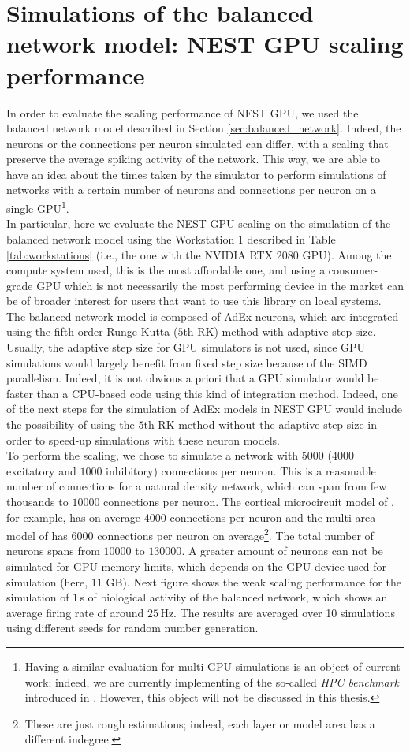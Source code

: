 \documentclass[a4paper, 12pt, twoside, openright]{book}
\begin{document}
\section{Simulations of the balanced network model: NEST GPU scaling performance}
In order to evaluate the scaling performance of NEST GPU, we used the balanced network model described in Section \ref{sec:balanced_network}. Indeed, the neurons or the connections per neuron simulated can differ, with a scaling that preserve the average spiking activity of the network. This way, we are able to have an idea about the times taken by the simulator to perform simulations of networks with a certain number of neurons and connections per neuron on a single GPU\footnote{Having a similar evaluation for multi-GPU simulations is an object of current work; indeed, we are currently implementing of the so-called \textit{HPC benchmark} introduced in \cite{Morrison2007}. However, this object will not be discussed in this thesis.}.\\
In particular, here we evaluate the NEST GPU scaling on the simulation of the balanced network model using the Workstation 1 described in Table \ref{tab:workstations} (i.e., the one with the NVIDIA RTX 2080 GPU). Among the compute system used, this is the most affordable one, and using a consumer-grade GPU which is not necessarily the most performing device in the market can be of broader interest for users that want to use this library on local systems.\\
The balanced network model is composed of AdEx neurons, which are integrated using the fifth-order Runge-Kutta ($5$th-RK) method with adaptive step size. Usually, the adaptive step size for GPU simulators is not used, since GPU simulations would largely benefit from fixed step size because of the SIMD parallelism. Indeed, it is not obvious a priori that a GPU simulator would be faster than a CPU-based code using this kind of integration method. Indeed, one of the next steps for the simulation of AdEx models in NEST GPU would include the possibility of using the $5$th-RK method without the adaptive step size in order to speed-up simulations with these neuron models.\\
To perform the scaling, we chose to simulate a network with $5000$ ($4000$ excitatory and $1000$ inhibitory) connections per neuron. This is a reasonable number of connections for a natural density network, which can span from few thousands to $10000$ connections per neuron. The cortical microcircuit model of \cite{Potjans2012}, for example, has on average $4000$ connections per neuron and the multi-area model of \cite{Schmidt2018} has $6000$ connections per neuron on average\footnote{These are just rough estimations; indeed, each layer or model area has a different indegree.}. The total number of neurons spans from $10000$ to $130000$. A greater amount of neurons can not be simulated for GPU memory limits, which depends on the GPU device used for simulation (here, $11$ GB). Next figure shows the weak scaling performance for the simulation of $1$\,s of biological activity of the balanced network, which shows an average firing rate of around $25$\,Hz. The results are averaged over 10 simulations using different seeds for random number generation.
\end{document}
